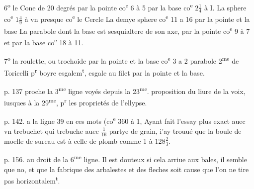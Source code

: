 \documentclass[11pt,a4paper]{article}
\begin{document}
6\textsuperscript{o} le Cone de 20 degrés par la pointe co\textsuperscript{e} 6 à 5 par la base co\textsuperscript{e} $2\frac{1}{4}$ à I.
La sphere co\textsuperscript{e} $1\frac{4}{9}$ à vn presque co\textsuperscript{e} le Cercle
La demye sphere co\textsuperscript{e} 11 a 16 par la pointe et la base
La parabole dont la base est sesquialtere de son axe, par la pointe co\textsuperscript{e} 9 à 7 et par la base co\textsuperscript{e} 18 à 11.

7\textsuperscript{o} la roulette, ou trochoide par la pointe et la base co\textsuperscript{e} 3 a 2
parabole 2\textsuperscript{me} de Toricelli p\textsuperscript{r} boyre esgalem\textsuperscript{t}, esgale au filet par la pointe et la base.

p. 137 proche la 3\textsuperscript{me} ligne
voyés depuis la 23\textsuperscript{me}. proposition du liure de la voix, iusques à la 29\textsuperscript{me}, p\textsuperscript{r} les proprietés de l'ellypse.

p. 142. a la ligne 39 en ces mots (co\textsuperscript{e} 360 à 1,
Ayant fait l'essay plus exact auec vn trebuchet qui trebuche auec $\frac{1}{16}$ partye de grain, i'ay trouué que la boule de moelle de sureau est à celle de plomb comme 1 à $128\frac{2}{3}$.

p. 156. au droit de la 6\textsuperscript{me} ligne.
Il est douteux si cela arriue aux bales, il semble que no, et que la fabrique des arbalestes et des fleches soit cause que l'on ne tire pas horizontalem\textsuperscript{t}.

\end{document}
